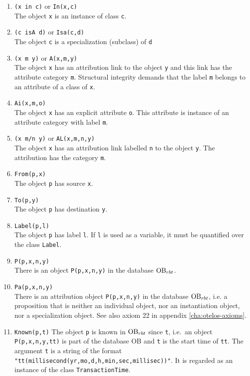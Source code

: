 \begin{enumerate}
\item {\tt (x in c)} or {\tt In(x,c)}\\
The object {\tt x} is an instance of class {\tt c}.
\item {\tt (c isA d)}  or {\tt Isa(c,d)}\\
The object {\tt c} is a specialization (subclass) of {\tt d}
\item {\tt (x m y)} or {\tt A(x,m,y)}\\
The object {\tt x} has an attribution link to the object  {\tt y} and this link
has the attribute category  {\tt m}.
Structural integrity demands that the label {\tt m} belongs to an attribute of a class
of {\tt x}.
\item {\tt Ai(x,m,o)}\\
The object {\tt x} has an explicit attribute {\tt o}. This attribute is instance of
an attribute category with label {\tt m}.
\item {\tt (x m/n y)} or {\tt AL(x,m,n,y)}\\
The object {\tt x} has an attribution link labelled {\tt n} to the object  {\tt y}. The attribution has the
category {\tt m}.
\item {\tt From(p,x)}\\
The object {\tt p} has source {\tt x}.
\item {\tt To(p,y)}\\
The object {\tt p} has destination {\tt y}.
\item {\tt Label(p,l)}\\
The object {\tt p} has label {\tt l}. If {\tt l} is used as a variable, it must be quantified over the
class {\tt Label}.
\item {\tt P(p,x,n,y)}\\
There is an object {\tt P(p,x,n,y)} in the database $\hbox{\rm OB}_{rbt}$.
\item {\tt Pa(p,x,n,y)}\\
There is an attribution object {\tt P(p,x,n,y)} in the database $\hbox{\rm OB}_{rbt}$, i.e. a proposition that is neither an individual object,
nor an instantiation object, nor a specialization object. See also axiom 22 in appendix \ref{cha:otelos-axioms}.
\item {\tt Known(p,t)}
The object {\tt p} is known in $\hbox{\rm OB}_{rbt}$  since {\tt t}, i.e.\ an object {\tt P(p,x,n,y,tt)} is
part of the database OB and {\tt t} is the start time of {\tt tt}. The argument
{\tt t} is a string of the format \verb+"tt(millisecond(yr,mo,d,h,min,sec,millisec))"+.
It is regarded as an instance of the class {\tt TransactionTime}.

\end{enumerate}
